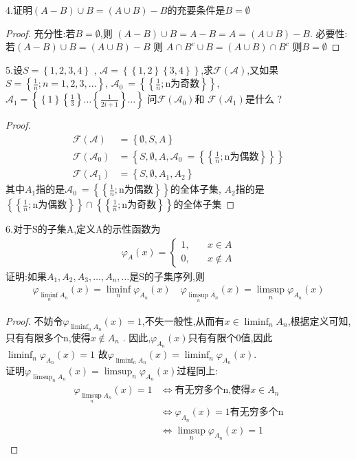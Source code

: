 4.证明\((A-B) \cup B = (A \cup B) - B\)的充要条件是\(B=\emptyset\)
\begin{proof}
    充分性:若\(B = \emptyset\),则 \((A -B) \cup B = A-B = A = (A \cup B) -B\). 
    必要性:若\((A-B) \cup B = (A \cup B) - B\) 则 \(A\cap B^{c} \cup B = (A \cup B) \cap B^{c}\) 则\(B =\emptyset\)
\end{proof}
5.设\(S = \left\{1,2,3,4\right\}\) , \(\mathscr{A} = \left\{\left\{1,2\right\}\left\{3,4\right\}\right\}\),求\(\mathscr{F}(\mathscr{A})\),又如果\(S = \left\{\frac{1}{n} ; n=1,2,3 , \dots \right\} \), \(\mathscr{A}_0\ = \left\{\left\{\frac{1}{n}; \text{n为奇数}\right\}\right\}\), \(\mathscr{A}_1 = \left\{\left\{1\right\}\left\{\frac{1}{3}\right\} \dots \left\{\frac{1}{2i+1}\right\}\dots \right\}\)
问\(\mathscr{F} (\mathscr{A}_0)\)和 \(\mathscr{F}(\mathscr{A}_1)\)是什么 ? 
\begin{proof}
    \begin{align*}
        \mathscr{F}(\mathscr{A})&= \left\{\emptyset , S , A \right\} \\ 
        \mathscr{F}(\mathscr{A}_0)&= \left\{S , \emptyset , A, \mathscr{A}_0\ = \left\{\left\{\frac{1}{n}; \text{n为偶数}\right\}\right\}\right\} \\ 
        \mathscr{F}(\mathscr{A}_1) &= \left\{S, \emptyset, A_1 ,A_2\right\}
    \end{align*}
    其中\(A_1\)指的是\(\mathscr{A}_0\ = \left\{\left\{\frac{1}{n}; \text{n为偶数}\right\}\right\}\)的全体子集, \(A_2\)指的是\( \left\{\left\{\frac{1}{n}; \text{n为偶数}\right\}\right\} \cap  \left\{\left\{\frac{1}{n}; \text{n为奇数}\right\}\right\}\)的全体子集
\end{proof}
6.对于S的子集A,定义A的示性函数为
\begin{align}
\varphi_{A}(x) = \begin{cases}
    1,\quad &x\in A \\ 
    0,\quad &x \notin A 
\end{cases}    
\end{align}
证明:如果\(A_1,A_2,A_3 , \dots ,A_n ,\dots \)是S的子集序列,则 \begin{align*}
    \varphi_{\liminf_{n}A_n}(x) = \liminf_{n} \varphi_{A_n} (x) \quad  \varphi_{\limsup_{n}A_n}(x) = \limsup_{n} \varphi_{A_n} (x)
\end{align*}
\begin{proof}
    不妨令\(\varphi_{\liminf_{n} A_n}(x) = 1 \),不失一般性,从而有\(x \in \liminf_{n}A_n\),根据定义可知,只有有限多个n,使得\(x \notin A_n\) . 因此,\(\varphi_{A_n}(x)\)只有有限个0值,因此\(\liminf_{n}\varphi_{A_n}(x) = 1 \)
    故\(\varphi_{\liminf_{n}A_n}(x) =\liminf_{n}\varphi_{A_n}(x)\).
    \\ 
    证明\(\varphi_{\limsup_{n}A_n}(x) = \limsup_{n} \varphi_{A_n} (x)\)过程同上:\begin{align*}
        \varphi_{\limsup_{n}A_n }(x) = 1 &\Leftrightarrow  \text{有无穷多个n,使得} x \in A_n \\ 
        &\Leftrightarrow\varphi_{A_n}(x) =1 \text{有无穷多个n} \\ 
        &\Leftrightarrow \limsup_{n}\varphi_{A_n}(x) = 1
    \end{align*}
\end{proof}

